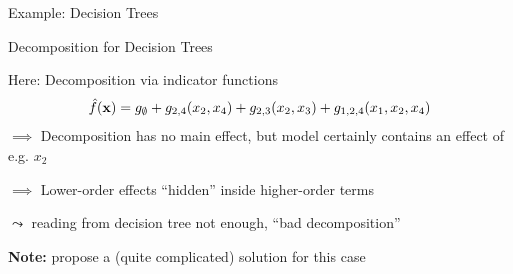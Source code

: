 \documentclass[10pt,compress,t,notes=noshow, xcolor=table]{beamer}
\begin{document}
\begin{frame}{Example: Decision Trees}
{\begin{center}
\end{center}
}

    
\end{frame}

\begin{frame}{Decomposition for Decision Trees}
    

Here: Decomposition via indicator functions
$$
\hat{f}(\mathbf{x}) = g_\emptyset + g_{2,4}(x_2, x_4) + g_{2,3}(x_2, x_3) + g_{1, 2, 4}(x_1, x_2, x_4)
$$
$\implies$ Decomposition has no main effect, but model certainly contains an effect of e.g. $x_2$

$\implies$ Lower-order effects ``hidden'' inside higher-order terms

$\leadsto$ reading from decision tree not enough, ``bad decomposition''



\pause
\textbf{Note:}  propose a (quite complicated) solution for this case

\end{frame}
\end{document}
